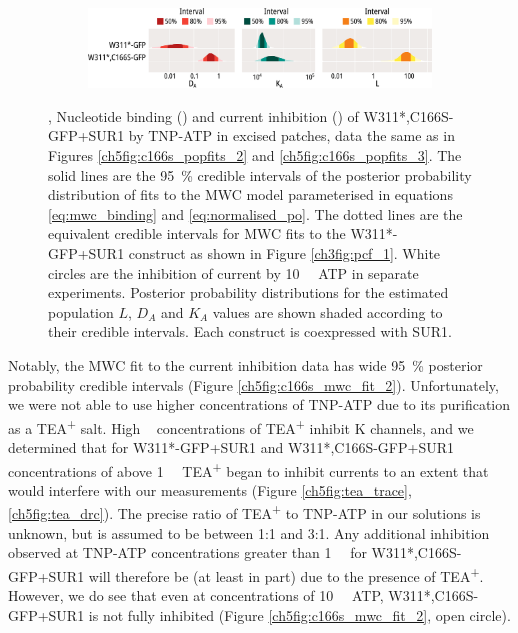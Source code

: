 \begin{figure}[hbtp]
\begin{subfigure}[t]{0.9\textwidth}
		\includegraphics[width=\textwidth]{mwc_c166s_2.pdf}
	\end{subfigure}
	\caption[C166S alters transduction of nucleotide binding to Kir6.2]{
	{\bf{}}
	,  Nucleotide binding () and current inhibition () of W311*,C166S-GFP+SUR1 by TNP-ATP in excised patches, data the same as in Figures \ref{ch5fig:c166s_popfits_2} and \ref{ch5fig:c166s_popfits_3}.
	The solid lines are the \SI{95}{\percent} credible intervals of the posterior probability distribution of fits to the MWC model parameterised in equations \ref{eq:mwc_binding} and \ref{eq:normalised_po}.
	The dotted lines are the equivalent credible intervals for MWC fits to the W311*-GFP+SUR1 construct as shown in Figure \ref{ch3fig:pcf_1}.
	White circles are the inhibition of current by \SI{10}{\milli\Molar} ATP in separate experiments.
	 Posterior probability distributions for the estimated population $L$, $D_A$ and $K_A$ values are shown shaded according to their credible intervals.
	Each construct is coexpressed with SUR1.
	}\label{ch5fig:c166s_3}
\end{figure}

Notably, the MWC fit to the current inhibition data has wide \SI{95}{\percent} posterior probability credible intervals (Figure \ref{ch5fig:c166s_mwc_fit_2}).
Unfortunately, we were not able to use higher concentrations of TNP-ATP due to its purification as a TEA\textsuperscript{+} salt.
High \si{\milli\Molar} concentrations of TEA\textsuperscript{+} inhibit K\ATP{} channels, and we determined that for W311*-GFP+SUR1 and W311*,C166S-GFP+SUR1 concentrations of above \SI{1}{\milli\Molar} TEA\textsuperscript{+} began to inhibit currents to an extent that would interfere with our measurements (Figure \ref{ch5fig:tea_trace}, \ref{ch5fig:tea_drc}).
The precise ratio of TEA\textsuperscript{+} to TNP-ATP in our solutions is unknown, but is assumed to be between 1:1 and 3:1.
Any additional inhibition observed at TNP-ATP concentrations greater than \SI{1}{\milli\Molar} for W311*,C166S-GFP+SUR1 will therefore be (at least in part) due to the presence of TEA\textsuperscript{+}.
However, we do see that even at concentrations of \SI{10}{\milli\Molar} ATP, W311*,C166S-GFP+SUR1 is not fully inhibited (Figure \ref{ch5fig:c166s_mwc_fit_2}, open circle).


